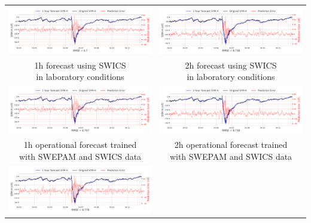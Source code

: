 \documentclass[draft,sw]{agutexSI2019}
\begin{document}
\begin{table}
\centering
\begin{tabular}{cc}
\includegraphics[width=0.49\linewidth]{paper_plots_shade/1h_swics/1h_swics_storm_31.png}
&
\includegraphics[width=0.49\linewidth]{paper_plots_shade/2h_swics/2h_swics_storm_31.png}
\\
\shortstack{1h forecast using SWICS\\ in laboratory conditions} & \shortstack{2h forecast using SWICS\\ in laboratory conditions}
\vspace*{12pt}
\\
\includegraphics[width=0.49\linewidth]{paper_plots_shade/1h_swics_rt/1h_swics_rt_storm_31.png}
&
\includegraphics[width=0.49\linewidth]{paper_plots_shade/2h_swics_rt/2h_swics_rt_storm_31.png}
\\
\shortstack{1h operational forecast trained\\ with SWEPAM and SWICS data} & \shortstack{2h operational forecast trained\\ with SWEPAM and SWICS data}
\vspace*{12pt}
\\
\includegraphics[width=0.49\linewidth]{paper_plots_shade/1h_swepam_rt/1h_swepam_rt_storm_31.png}

\end{tabular}
\end{table}
\end{document}
